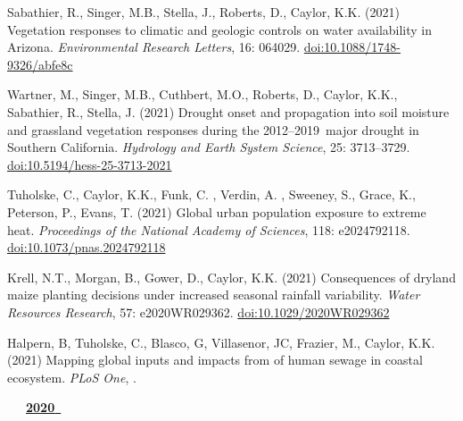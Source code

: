 \begin{etaremune}
\item Sabathier, R., Singer, M.B., Stella, J., Roberts, D., Caylor, K.K. (2021) Vegetation responses to climatic and geologic controls on water availability in Arizona. \emph{Environmental Research Letters}, 16: 064029. \href{https://doi.org/10.1088/1748-9326/abfe8c}{doi:10.1088/1748-9326/abfe8c}
\item Wartner, M., Singer, M.B., Cuthbert, M.O., Roberts, D., Caylor, K.K., Sabathier, R., Stella, J. (2021) Drought onset and propagation into soil moisture and grassland vegetation responses during the 2012–2019 major drought in Southern California. \emph{Hydrology and Earth System Science}, 25: 3713–3729. \href{https://doi.org/10.5194/hess-25-3713-2021}{doi:10.5194/hess-25-3713-2021}
\item Tuholske, C., Caylor, K.K., Funk, C. , Verdin, A. , Sweeney, S., Grace, K., Peterson, P., Evans, T. (2021) Global urban population exposure to extreme heat. \emph{Proceedings of the National Academy of Sciences}, 118: e2024792118. \href{https://doi.org/10.1073/pnas.2024792118}{doi:10.1073/pnas.2024792118}
\item Krell, N.T., Morgan, B., Gower, D., Caylor, K.K. (2021) Consequences of dryland maize planting decisions under increased seasonal rainfall variability. \emph{Water Resources Research}, 57: e2020WR029362. \href{https://doi.org/10.1029/2020WR029362}{doi:10.1029/2020WR029362}
\item Halpern, B, Tuholske, C., Blasco, G, Villasenor, JC, Frazier, M., Caylor, K.K. (2021) Mapping global inputs and impacts from of human sewage in coastal ecosystem. \emph{PLoS One}, . 


\mbox{\ \ \ \underline{\textbf{2020 }}}


\end{etaremune}
